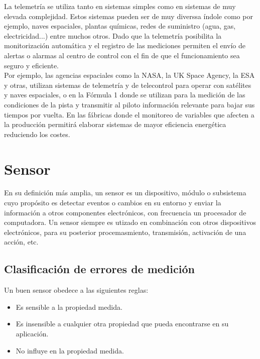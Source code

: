 La telemetría se utiliza tanto en sistemas simples como en sistemas de muy elevada complejidad. Estos sistemas pueden ser de muy diverssa índole como por ejemplo, naves espaciales,
plantas químicas, redes de suministro (agua, gas, electricidad...) entre muchos otros. Dado que la telemetría posibilita la monitorización automática y el registro de las mediciones
permiten el envío de alertas o alarmas al centro de control con el fin de que el funcionamiento sea seguro y eficiente.\\

Por ejemplo, las agencias espaciales como la NASA, la UK Space Agency, la ESA y otras, utilizan sistemas de telemetría y de telecontrol para operar con satélites y naves espaciales,
o en la Fórmula 1 donde se utilizan para la medición de las condiciones de la pista y transmitir al piloto información relevante para bajar sus tiempos por vuelta. En las fábricas donde
el monitoreo de variables que afecten a la producción permitirá elaborar sistemas de mayor eficiencia energética reduciendo los costes.\\

\section{Sensor}
\label{sec:sensor-definicion}

En su definición más amplia, un sensor es un dispositivo, módulo o subsistema cuyo propósito es detectar eventos o cambios en su entorno y enviar la información a otros
componentes electrónicos, con frecuencia un procesador de computadora. Un sensor siempre es utizado en combinación con otros dispositivos electrónicos, para su posterior 
procemasmiento, transmisión, activación de una acción, etc.\\

\subsection{Clasificación de errores de medición}

Un buen sensor obedece a las siguientes reglas:

\begin{itemize}
 \item Es sensible a la propiedad medida.
 \item Es insensible a cualquier otra propiedad que pueda encontrarse en su aplicación.
 \item No influye en la propiedad medida.
\end{itemize}

